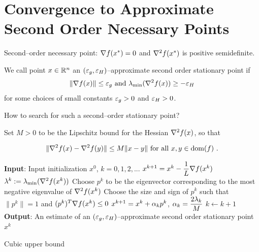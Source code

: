 \section{Convergence to Approximate Second Order Necessary Points}

Second--order necessary point: $\nabla f(x^*)=0$ and $\nabla^2 f(x^*)$ is positive semidefinite.

\begin{definition}\label{Def:ApproximateSecondOrderStationary}
We call point $x\in \mathbb R^n$ an $(\varepsilon_g, \varepsilon_H)$--approximate second order stationary point if
\begin{equation}
\|\nabla f(x)\|\leq \varepsilon_g \text{ and } \lambda_{\text{min}}(\nabla^2 f(x))\geq -\varepsilon_H
\end{equation}
for some choices of small constants $\varepsilon_g>0$ and $\varepsilon_H>0$.
\end{definition}

How to search for such a second--order stationary point?

Set $M>0$ to be the Lipschitz bound for the Hessian $\nabla^2 f(x)$, so that 

\begin{equation}\label{Eq:Hessianf-M-Lipschitz}
\|\nabla^2 f(x)-\nabla^2 f(y)\|\leq M\|x-y\| \text{ for all } x, y\in \text{dom}(f) \ .
\end{equation}

\begin{algorithm}
\caption{Search for second--order approximate stationary point based on Gradient Descent}
\label{Alg:GDSecondOrder}
\begin{algorithmic}[1]
\STATE \textbf{Input}: Input initialization $x^0$, $k=0,1,2,...$
        \STATE $x^{k+1}=x^k-\dfrac{1}{L}\nabla f(x^k)$
    \ELSE
        \STATE $\lambda^k:=\lambda_{\text{min}}(\nabla^2 f(x^k))$
        \STATE Choose $p^k$ to be the eigenvector corresponding to the most negative eigenvalue of $\nabla^2 f(x^k)$
        \STATE Choose the size and sign of $p^k$ such that $\|p^k\|=1$ and $(p^k)^T\nabla f(x^k)\leq 0$
        \STATE $x^{k+1}=x^k+\alpha_kp^k$, $\alpha_k=\dfrac{2\lambda_k}{M}$
    \ENDIF
    \STATE $k\leftarrow k+1$
\ENDWHILE
\STATE \textbf{Output}: An estimate of an $(\varepsilon_g, \varepsilon_H)$--approximate second order stationary point $x^k$
\end{algorithmic}
\end{algorithm}

Cubic upper bound

